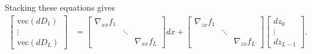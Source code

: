 \documentclass{article}
\begin{document}
Stacking these equations gives
\begin{align}
  \begin{bmatrix}
    \mathrm{vec}\left(dD_1\right) \\
    \vdots                        \\
    \mathrm{vec}\left(dD_L\right)
  \end{bmatrix}
  & =
  \begin{bmatrix}
    \nabla_{xx} f_1 &        &                 \\
    & \ddots &                 \\
    &        & \nabla_{xx} f_L
  \end{bmatrix}
  dx
  +
  \begin{bmatrix}
    \nabla_{zx} f_1 &        &                 \\
    & \ddots &                 \\
    &        & \nabla_{zx} f_L
  \end{bmatrix}
  \begin{bmatrix}
    dz_0 \\ \vdots \\ dz_{L-1}
  \end{bmatrix}
  .
\end{align}
\end{document}
